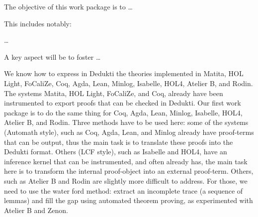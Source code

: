 \begin{workpackage}[id=instrumentation,wphases=0-48,type=RTD,
  short=Instrument Provers,%
  title=Instrument proof systems to produce Dedukti proof,
  lead=ISa,
  ISaRM=10,
  DelRM=48,
  GURM=48]
  

\begin{wpobjectives}
  The objective of this work package is to \ldots

This includes notably:
  \begin{compactitem}
  \item \ldots
  \end{compactitem}
  A key aspect will be to foster \ldots
\end{wpobjectives}


\begin{wpdescription}
We know how to express in Dedukti the theories implemented in Matita,
HOL Light, FoCaliZe, Coq, Agda, Lean, Minlog, Isabelle, HOL4,
Atelier B, and Rodin. The systems Matita, HOL Light, FoCaliZe, and
Coq, already have been instrumented to export proofs that can be
checked in Dedukti. Our first work package is to do the same thing for
Coq, Agda, Lean, Minlog, Isabelle, HOL4, Atelier B, and
Rodin. Three methods have to be used here: some of the systems
(Automath style), such as Coq, Agda, Lean, and Minlog already have
proof-terms that can be output, thus the main task is to translate
these proofs into the Dedukti format. Others (LCF style), such as
Isabelle and HOL4, have an inference kernel that can be
instrumented, and often already has, the main task here is to transform
the internal proof-object into an external proof-term. Others, such as
Atelier B and Rodin are slightly more difficult to address. For those,
we need to use the water ford method: extract an incomplete trace (a
sequence of lemmas) and fill the gap using automated theorem proving,
as experimented with Atelier B and Zenon.
\end{wpdescription}

\begin{tasklist}
\begin{task}[id=agda,title=instrument Agda]

\end{task}


\end{tasklist}
\end{workpackage}
